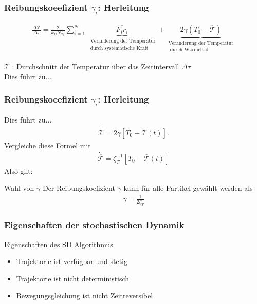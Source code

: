 \documentclass{beamer}
\begin{document}
\begin{frame}
	\frametitle{Reibungskoeefizient $\gamma_i$: Herleitung}
	\begin{align*}
		\frac{\Delta \mathcal{T}}{\Delta \tau} = \frac{2}{k_B N_{df}} \sum\limits_{i=1}^N  \underbrace{\overline{F_i \dot{r}_i} }_ {\substack{\text{ Veränderung der Temperatur} \\ \text{ durch systematische Kraft}} }+\underbrace{ 2 \gamma (T_0 - \overline{\mathcal{T}})  }_{\substack{\text{Veränderung der Temperatur} \\ \text{ durch Wärmebad}}}
	\end{align*} 	
	
	$\overline{\mathcal{T}}$ : Durchschnitt der Temperatur über das Zeitintervall $\Delta \tau$\\
	Dies führt zu...
\end{frame}

\begin{frame} 
	\frametitle{Reibungskoeefizient $\gamma_i$: Herleitung} 
	
	Dies führt zu...
	\begin{align*}
		\dot{ \overline{\mathcal{T}} } = 2 \gamma [T_0 - \overline{\mathcal{T}}(t)]  .
	\end{align*}
	Vergleiche diese Formel mit 
	\begin{align*}
	\dot{ \overline{\mathcal{T}} } = \zeta_T^{-1} [T_0 - \overline{\mathcal{T}}(t)] 
	\end{align*}
	Also gilt:
	\begin{block}{Wahl von $\gamma$}
		Der Reibungskoefizient $\gamma$ kann für alle Partikel gewählt werden als 
		\begin{align*}
			\gamma = \frac{1}{2 \zeta_T}
		\end{align*}
	\end{block}
\end{frame}


\begin{frame} 
	\frametitle{Eigenschaften der stochastischen Dynamik} 
	\begin{block}{Eigenschaften des SD Algorithmus}
		\begin{itemize}
			\item Trajektorie ist verfügbar und stetig
			\item  Trajektorie ist nicht deterministisch
			\item Bewegungsgleichung ist nicht Zeitreversibel
		\end{itemize}
	\end{block}
\end{frame}
	
\end{document}
